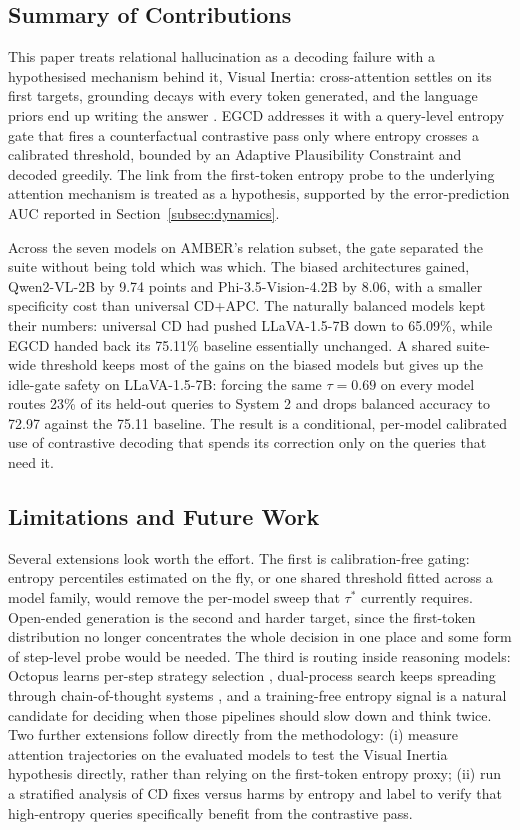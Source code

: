 \documentclass[pdflatex,sn-basic,Numbered]{sn-jnl}
\theoremstyle{thmstyleone}
\theoremstyle{thmstyletwo}
\theoremstyle{thmstylethree}
\begin{document}
\subsection{Summary of Contributions}\label{subsec:summary}

This paper treats relational hallucination as a decoding failure with a hypothesised mechanism behind it, Visual Inertia: cross-attention settles on its first targets, grounding decays with every token generated, and the language priors end up writing the answer \cite{gong2026attention}. EGCD addresses it with a query-level entropy gate that fires a counterfactual contrastive pass only where entropy crosses a calibrated threshold, bounded by an Adaptive Plausibility Constraint and decoded greedily. The link from the first-token entropy probe to the underlying attention mechanism is treated as a hypothesis, supported by the error-prediction AUC reported in Section~\ref{subsec:dynamics}.

Across the seven models on AMBER's relation subset, the gate separated the suite without being told which was which. The biased architectures gained, Qwen2-VL-2B by 9.74 points and Phi-3.5-Vision-4.2B by 8.06, with a smaller specificity cost than universal CD+APC. The naturally balanced models kept their numbers: universal CD had pushed LLaVA-1.5-7B down to 65.09\%, while EGCD handed back its 75.11\% baseline essentially unchanged. A shared suite-wide threshold keeps most of the gains on the biased models but gives up the idle-gate safety on LLaVA-1.5-7B: forcing the same $\tau = 0.69$ on every model routes 23\% of its held-out queries to System 2 and drops balanced accuracy to 72.97 against the 75.11 baseline. The result is a conditional, per-model calibrated use of contrastive decoding that spends its correction only on the queries that need it.

\subsection{Limitations and Future Work}\label{subsec:future}

Several extensions look worth the effort. The first is calibration-free gating: entropy percentiles estimated on the fly, or one shared threshold fitted across a model family, would remove the per-model sweep that $\tau^{*}$ currently requires. Open-ended generation is the second and harder target, since the first-token distribution no longer concentrates the whole decision in one place and some form of step-level probe would be needed. The third is routing inside reasoning models: Octopus learns per-step strategy selection \cite{suo2025octopus}, dual-process search keeps spreading through chain-of-thought systems \cite{cheng2025think,li2025system}, and a training-free entropy signal is a natural candidate for deciding when those pipelines should slow down and think twice. Two further extensions follow directly from the methodology: (i) measure attention trajectories on the evaluated models to test the Visual Inertia hypothesis directly, rather than relying on the first-token entropy proxy; (ii) run a stratified analysis of CD fixes versus harms by entropy and label to verify that high-entropy queries specifically benefit from the contrastive pass.
\end{document}

